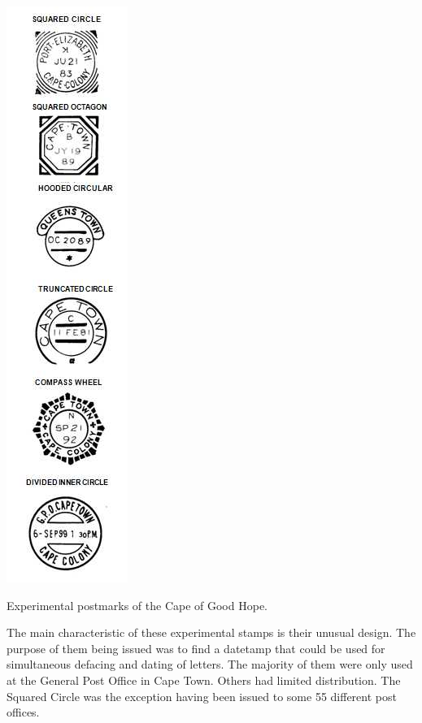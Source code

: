 \begin{marginfigure}
\includegraphics[width=.85\textwidth]{../cape-of-good-hope/experimental.jpg}
\caption{Experimental postmarks of the Cape of Good Hope.}
\end{marginfigure}	
The main characteristic of these experimental stamps is their unusual design. The purpose of them being issued was 
to find a datetamp that could be used for simultaneous defacing 
and dating of letters. The majority of them were only used at the General 
Post Office in Cape Town.  Others had limited distribution. 
The Squared Circle was the exception having been issued to some 
55 different post offices.


